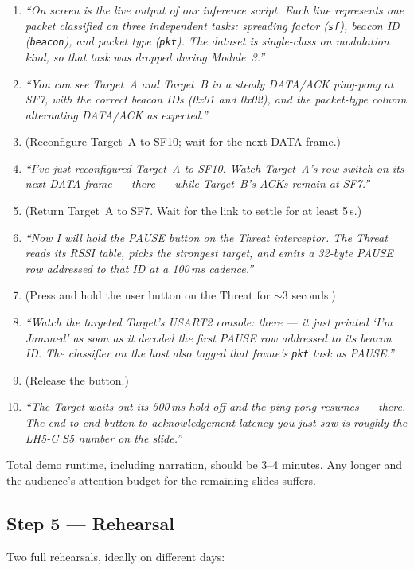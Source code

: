 \documentclass[11pt,letterpaper]{article}
\begin{document}
\begin{enumerate}[leftmargin=2em]
	\item \emph{``On screen is the live output of our inference script. Each line represents one packet classified on three independent tasks: spreading factor (\texttt{sf}), beacon ID (\texttt{beacon}), and packet type (\texttt{pkt}). The dataset is single-class on modulation kind, so that task was dropped during Module~3.''}
	\item \emph{``You can see Target~A and Target~B in a steady DATA/ACK ping-pong at SF7, with the correct beacon IDs (0x01 and 0x02), and the packet-type column alternating DATA/ACK as expected.''}
	\item (Reconfigure Target~A to SF10; wait for the next DATA frame.)
	\item \emph{``I've just reconfigured Target~A to SF10. Watch Target~A's row switch on its next DATA frame --- there --- while Target~B's ACKs remain at SF7.''}
	\item (Return Target~A to SF7. Wait for the link to settle for at least 5\,s.)
	\item \emph{``Now I will hold the PAUSE button on the Threat interceptor. The Threat reads its RSSI table, picks the strongest target, and emits a 32-byte PAUSE row addressed to that ID at a 100\,ms cadence.''}
	\item (Press and hold the user button on the Threat for $\sim$3 seconds.)
	\item \emph{``Watch the targeted Target's USART2 console: there --- it just printed `I'm Jammed' as soon as it decoded the first PAUSE row addressed to its beacon ID. The classifier on the host also tagged that frame's \texttt{pkt} task as PAUSE.''}
	\item (Release the button.)
	\item \emph{``The Target waits out its 500\,ms hold-off and the ping-pong resumes --- there. The end-to-end button-to-acknowledgement latency you just saw is roughly the LH5-C S5 number on the slide.''}
\end{enumerate}

Total demo runtime, including narration, should be 3--4 minutes. Any longer and the audience's attention budget for the remaining slides suffers.

\subsection{Step 5 --- Rehearsal}
Two full rehearsals, ideally on different days:
\end{document}
